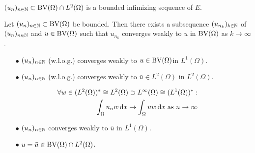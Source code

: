 \begin{frame}
  $(u_n)_{n\in\mathbb{N}}\subset\textup{BV}(\Omega)\cap L^2(\Omega)$ is a bounded 
  infimizing sequence of $E$.
  \pause
  \begin{block}{}
    Let $(u_n)_{n\in\mathbb{N}}\subset \textup{BV}(\Omega)$ be bounded. Then there
    exists a subsequence $(u_{n_k})_{k\in\mathbb{N}}$ of $(u_n)_{n\in\mathbb{N}}$ and
    $u\in\textup{BV}(\Omega)$
    such that $u_{n_k}$ converges weakly to $u$ in $\textup{BV}(\Omega)$ as
    $k\rightarrow\infty$.
  \end{block}

  \pause
  \begin{itemize}
    \item[$\bullet$] $(u_n)_{n\in\mathbb{N}}$ (w.l.o.g.) converges weakly to
      $u\in\textup{BV}(\Omega)$\pause in $L^1(\Omega)$.
      \pause
    \item[$\bullet$] $(u_n)_{n\in\mathbb{N}}$ (w.l.o.g.) converges weakly to
      $\bar{u}\in L^2(\Omega)$ in $L^2(\Omega)$.
  \end{itemize}
  \pause
  \begin{align*}
    \forall w\in (L^2(\Omega))^\ast\cong L^2(\Omega)
    \supset L^\infty(\Omega)\cong (L^1(\Omega))^\ast:\\
    \int_\Omega u_n w\,\mathrm{d}x\to \int_\Omega \bar{u} w\,\mathrm{d}x \text{ as } n\to\infty
  \end{align*}
  \pause
  \begin{itemize}
    \item[$\bullet$] $(u_n)_{n\in\mathbb{N}}$ converges weakly to $\bar{u}$ in
      $L^1(\Omega)$.
      \pause
    \item[$\bullet$] $u=\bar{u}\in \textup{BV}(\Omega)\cap L^2(\Omega)$.
  \end{itemize}
\end{frame}


